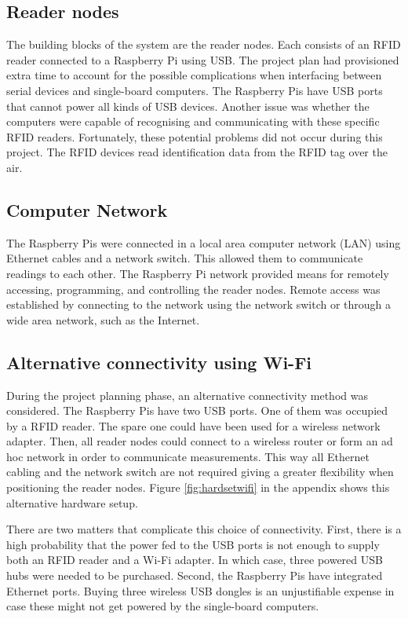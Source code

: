 \subsection{Reader nodes}

The building blocks of the system are the reader nodes. Each consists of an RFID reader connected to a Raspberry Pi using USB. The project plan had provisioned extra time to account for the possible complications when interfacing between serial devices and single-board computers. The Raspberry Pis have USB ports that cannot power all kinds of USB devices. Another issue was whether the computers were capable of recognising and communicating with these specific RFID readers. Fortunately, these potential problems did not occur during this project. The RFID devices read identification data from the RFID tag over the air.

\subsection{Computer Network}

The Raspberry Pis were connected in a local area computer network (LAN) using Ethernet cables and a network switch. This allowed them to communicate readings to each other. The Raspberry Pi network provided means for remotely accessing, programming, and controlling the reader nodes. Remote access was established by connecting to the network using the network switch or through a wide area network, such as the Internet.


\subsection{Alternative connectivity using Wi-Fi}

During the project planning phase, an alternative connectivity method was considered. The Raspberry Pis have two USB ports. One of them was occupied by a RFID reader. The spare one could have been used for a wireless network adapter. Then, all reader nodes could connect to a wireless router or form an ad hoc network in order to communicate measurements. This way all Ethernet cabling and the network switch are not required giving a greater flexibility when positioning the reader nodes. Figure \ref{fig:hardsetwifi} in the appendix shows this alternative hardware setup.

There are two matters that complicate this choice of connectivity. First, there is a high probability that the power fed to the USB ports is not enough to supply both an RFID reader and a Wi-Fi adapter. In which case, three powered USB hubs were needed to be purchased. Second, the Raspberry Pis have integrated Ethernet ports. Buying three wireless USB dongles is an unjustifiable expense in case these might not get powered by the single-board computers.

